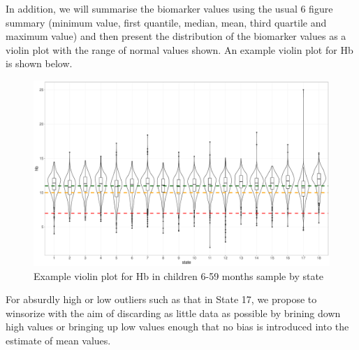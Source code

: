 \documentclass[12pt,a4paper]{article}
\begin{document}
In addition, we will summarise the biomarker values using the usual 6 figure summary (minimum value, first quantile, median, mean, third quartile and maximum value) and then present the distribution of the biomarker values as a violin plot with the range of normal values shown. An example violin plot for Hb is shown below.

\begin{figure}[H]

{\centering \includegraphics{sudanMNindicatorsV0.2.1_files/figure-latex/violin-1} 

}

\caption{Example violin plot for Hb in children 6-59 months sample by state}\label{fig:violin}
\end{figure}

For absurdly high or low outliers such as that in State 17, we propose to winsorize with the aim of discarding as little data as possible by brining down high values or bringing up low values enough that no bias is introduced into the estimate of mean values.

\newpage

\renewcommand\refname{References}

\end{document}
